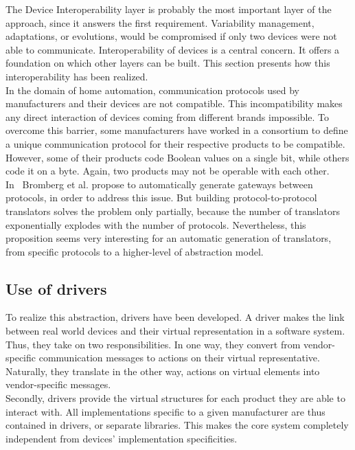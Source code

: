 The Device Interoperability layer is probably the most important layer of the approach, since it answers the first requirement. Variability management, adaptations, or evolutions, would be compromised if only two devices were not able to communicate. Interoperability of devices is a central concern. It offers a foundation on which other layers can be built. This section presents how this interoperability has been realized.\\

In the domain of home automation, communication protocols used by manufacturers and their devices are not compatible. This incompatibility makes any direct interaction of devices coming from different brands impossible. To overcome this barrier, some manufacturers have worked in a consortium to define a unique communication protocol for their respective products to be compatible. However, some of their products code Boolean values on a single bit, while others code it on a byte. Again, two products may not be operable with each other.\\
In~\cite{Bromberg:2009} Bromberg et al. propose to automatically generate gateways between protocols, in order to address this issue. But building protocol-to-protocol translators solves the problem only partially, because the number of translators exponentially explodes with the number of protocols. Nevertheless, this proposition seems very interesting for an automatic generation of translators, from specific protocols to a higher-level of abstraction model.

\subsection{Use of drivers}
\label{subsec:useOfDrivers}
To realize this abstraction, drivers have been developed. A driver makes the link between real world devices and their virtual representation in a software system. Thus, they take on two responsibilities. In one way, they convert from vendor-specific communication messages to actions on their virtual representative. Naturally, they translate in the other way, actions on virtual elements into vendor-specific messages. \\
Secondly, drivers provide the virtual structures for each product they are able to interact with. All implementations specific to a given manufacturer are thus contained in drivers, or separate libraries. This makes the core system completely independent from devices' implementation specificities.\\

